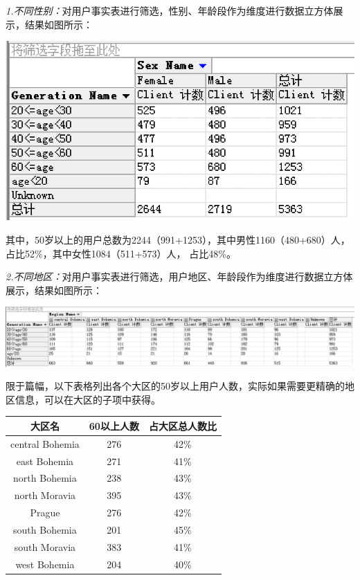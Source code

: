 \documentclass[a4paper]{article}
\begin{document}
\begin{enumerate}
  \textit{1.不同性别：}对用户事实表进行筛选，性别、年龄段作为维度进行数据立方体展示，结果如图所示：
  \begin{center}
    \includegraphics[scale=0.6]{Pictures/SEX}
  \end{center}
  其中，50岁以上的用户总数为2244（991+1253），其中男性1160（480+680）人，占比52\%，其中女性1084（511+573）人，
  占比48\%。

  \textit{2.不同地区：}对用户事实表进行筛选，用户地区、年龄段作为维度进行数据立方体展示，结果如图所示：
  \begin{center}
    \includegraphics[scale=0.3]{Pictures/DIS}
  \end{center}
  限于篇幅，以下表格列出各个大区的50岁以上用户人数，实际如果需要更精确的地区信息，可以在大区的子项中获得。

  \begin{center}
    \begin{tabular}{c|c|c} \hline \hline
      大区名              & 60以上人数  & 占大区总人数比\\ \hline
      central Bohemia    & 276        & 42\%\\ \hline
      east Bohemia       & 271        & 41\%\\ \hline
      north Bohemia      & 238        & 43\%\\ \hline
      north Moravia      & 395        & 43\%\\ \hline
      Prague             & 276        & 42\%\\ \hline
      south Bohemia      & 201        & 45\%\\ \hline
      south Moravia      & 383        & 41\%\\ \hline
      west Bohemia       & 204        & 40\%\\  \hline \hline
    \end{tabular}
  \end{center}


\end{enumerate}
\end{document}
